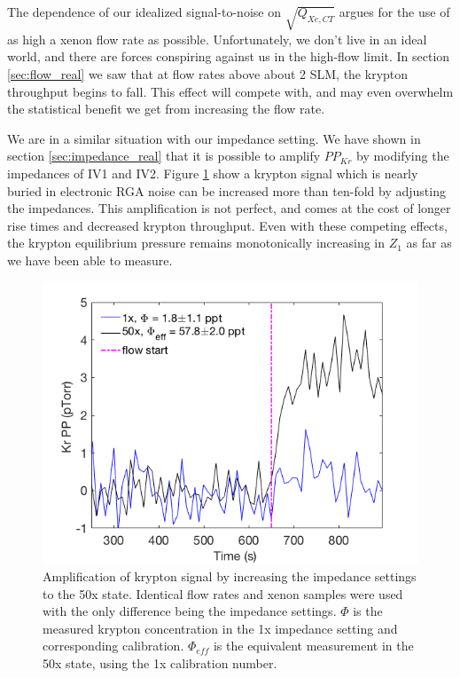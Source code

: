 The dependence of our idealized signal-to-noise on $\sqrt{Q_{Xe,CT}}$ argues for the use of as high a xenon flow rate as possible. Unfortunately, we don't live in an ideal world, and there are forces conspiring against us in the high-flow limit. In section \ref{sec:flow_real} we saw that at flow rates above about 2 SLM, the krypton throughput begins to fall. This effect will compete with, and may even overwhelm the statistical benefit we get from increasing the flow rate.

We are in a similar situation with our impedance setting. We have shown in section \ref{sec:impedance_real} that it is possible to amplify $PP_{Kr}$ by modifying the impedances of IV1 and IV2. Figure \ref{fig:ampimp} show a krypton signal which is nearly buried in electronic RGA noise can be increased more than ten-fold by adjusting the impedances. This amplification is not perfect, and comes at the cost of longer rise times and decreased krypton throughput. Even with these competing effects, the krypton equilibrium pressure remains monotonically increasing in $Z_1$ as far as we have been able to measure.
\begin{figure}[h]
  \includegraphics[width=\linewidth]{Figures/Adjusted_impedance_study.png}
  \caption{Amplification of krypton signal by increasing the impedance settings to the 50x state. Identical flow rates and xenon samples were used with the only difference being the impedance settings. $\Phi$ is the measured krypton concentration in the 1x impedance setting and corresponding calibration. $\Phi_{eff}$ is the equivalent measurement in the 50x state, using the 1x calibration number.  }
  \label{fig:ampimp}
\end{figure}


